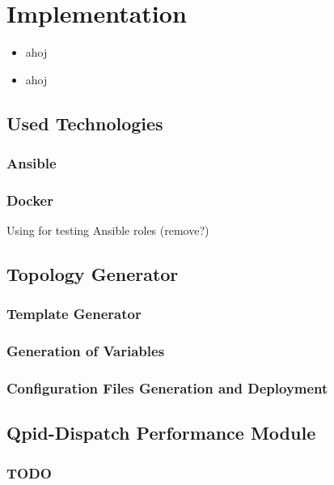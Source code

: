 \chapter{Implementation}
\label{Implementation}

\begin{itemize}
    \item ahoj
    \item ahoj
\end{itemize}

\section{Used Technologies}

\subsection{Ansible}

\subsection{Docker}
Using for testing Ansible roles (remove?)

\section{Topology Generator}

\subsection{Template Generator}

\subsection{Generation of Variables}

\subsection{Configuration Files Generation and Deployment}

\section{Qpid-Dispatch Performance Module}

\subsection{TODO}
